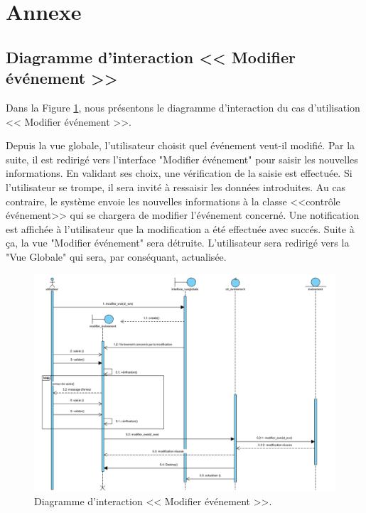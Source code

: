 
\appendix

\chapter*{Annexe}

\renewcommand{\headrulewidth}{1pt}




\section*{Diagramme d'interaction << Modifier \'ev\'enement >>}

Dans la Figure \ref{modifierevent}, nous pr\'esentons le diagramme d'interaction du cas d'utilisation << Modifier \'ev\'enement >>. 

Depuis la vue globale, l'utilisateur choisit quel \'ev\'enement veut-il modifi\'e. Par la suite, il est redirig\'e vers l'interface "Modifier \'ev\'enement" pour saisir les nouvelles informations. En validant ses choix, une v\'erification de la saisie est effectu\'ee. Si l'utilisateur se trompe, il sera invit\'e \`a ressaisir les donn\'ees introduites. Au cas contraire, le syst\`eme envoie les nouvelles informations \`a la classe <<contr\^ole \'ev\'enement>> qui se chargera de modifier l'\'ev\'enement concern\'e. Une notification est affich\'ee \`a l'utilisateur que la modification a \'et\'e effectu\'ee avec succ\'es. Suite \`a \c{c}a, la vue "Modifier \'ev\'enement" sera d\'etruite. L'utilisateur sera redirig\'e vers la "Vue Globale" qui sera, par cons\'equant, actualis\'ee.  
\begin{landscape}
\begin{figure}[H]
	\centering
		\includegraphics[width=21cm]{images/modifier_event.PNG}
	\caption{Diagramme d'interaction << Modifier \'ev\'enement >>.}
	\label{modifierevent}
\end{figure}
\end{landscape}

